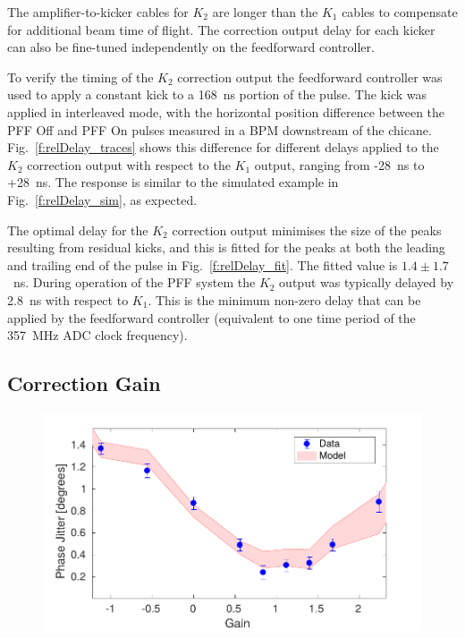 \documentclass[%
 reprint,
 superscriptaddress,
 amsmath,
 amssymb,
 prstab,
]{revtex4-1}
\begin{document}
The amplifier-to-kicker cables for \(K_2\) are longer than the \(K_1\) cables 
to compensate for additional beam time of flight. The 
correction output delay for each kicker can also be fine-tuned independently on 
the feedforward controller. 

To verify the timing of the \(K_2\) correction output the feedforward 
controller was used to apply a constant kick to a 168~ns portion of the pulse. 
The kick was applied in interleaved mode, with the horizontal position 
difference between the PFF Off and PFF On pulses measured in a BPM downstream 
of the chicane.
Fig.~\ref{f:relDelay_traces} shows this difference for different delays 
applied to the \(K_2\) correction output with respect to the \(K_1\) output, 
ranging from -28~ns to +28~ns. The response is similar to the simulated example 
in Fig.~\ref{f:relDelay_sim}, as expected.

The optimal delay for the \(K_2\) correction output minimises the size of the 
peaks resulting from residual kicks, and this is fitted for the peaks at both 
the leading and trailing end of the pulse in Fig.~\ref{f:relDelay_fit}. The 
fitted value is \(1.4\pm1.7\)~ns. During operation of the PFF system the 
\(K_2\) output was typically delayed by 2.8~ns with respect to \(K_1\). This is 
the minimum non-zero delay that can be applied by the feedforward controller 
(equivalent to one time period of the 357~MHz ADC clock frequency).

\subsection{\label{ss:gain}Correction Gain}

\begin{figure}
	\includegraphics[width=\columnwidth]{figs/comis/gScan}%
	\caption{\label{f:gScan}
	}
\end{figure}
\end{document}
